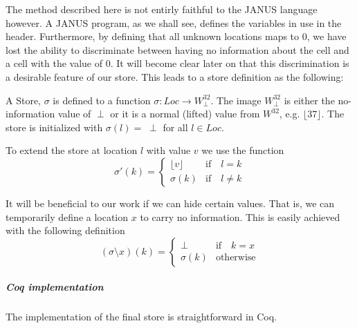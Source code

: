 The method described here is not entirly faithful to the JANUS
language however. A JANUS program, as we shall see, defines the
variables in use in the header. Furthermore, by defining that all
unknown locations maps to $0$, we have lost the ability to
discriminate between having no information about the cell and a cell
with the value of $0$. It will become clear later on that this
discrimination is a desirable feature of our store. This leads to a
store definition as the following:
\newcommand{\lift}[1]{\lfloor #1 \rfloor}
\begin{defn}
  A Store, $\sigma$ is defined to a function $\sigma \colon Loc \to
  W^{32}_\perp$. The image $W^{32}_\perp$ is either the no-information
  value of $\perp$ or it is a normal (lifted) value from $W^{32}$,
  e.g. $\lift{37}$. The store is initialized with $\sigma(l) = \;\perp$
  for all $l \in Loc$.

  To extend the store at location $l$ with value $v$ we use the
  function
  \begin{equation*}
    \sigma'(k) = \begin{cases}
      \lift{v}& \text{if}\quad l = k\\
      \sigma(k)& \text{if}\quad l \neq k
      \end{cases}
  \end{equation*}
\end{defn}
It will be beneficial to our work if we can hide certain values. That
is, we can temporarily define a location $x$ to carry no
information. This is easily achieved with the following definition
\begin{equation*}
  (\sigma \setminus x)(k) = \begin{cases}
    \perp& \text{if}\quad k = x\\
    \sigma(k)& \text{otherwise}
  \end{cases}
\end{equation*}

\subparagraph{Coq implementation}

The implementation of the final store is straightforward in Coq.
